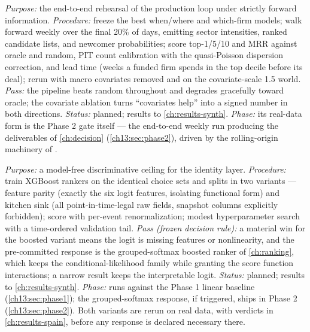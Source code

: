 \begin{protocol}
\label{chcp:prot:e5}
\emph{Purpose:} the end-to-end rehearsal of the production loop under strictly forward information.
\emph{Procedure:} freeze the best when/where and which-firm models; walk forward weekly over the final 20\% of
days, emitting sector intensities, ranked candidate lists, and newcomer probabilities; score top-1/5/10 and
MRR against oracle and random, PIT count calibration with the quasi-Poisson dispersion correction, and lead
time (weeks a funded firm spends in the top decile before its deal); rerun with macro covariates removed and
on the covariate-scale 1.5 world. \emph{Pass:} the pipeline beats random throughout and degrades gracefully
toward oracle; the covariate ablation turns ``covariates help'' into a signed number in both directions.
\emph{Status:} planned; results to \cref{ch:results-synth}. \emph{Phase:} its real-data form is the Phase 2
gate itself --- the end-to-end weekly run producing the deliverables of \cref{ch:decision}
(\cref{ch13:sec:phase2}), driven by the rolling-origin machinery of .
\end{protocol}

\begin{protocol}
\label{chcp:prot:b1}
\emph{Purpose:} a model-free discriminative ceiling for the identity layer. \emph{Procedure:} train XGBoost
rankers \citep{chenguestrin2016} on the identical choice sets and splits in two variants --- feature parity
(exactly the six logit features, isolating functional form) and kitchen sink (all point-in-time-legal raw
fields, snapshot columns explicitly forbidden); score with per-event renormalization; modest hyperparameter
search with a time-ordered validation tail. \emph{Pass (frozen decision rule):} a material win for the boosted
variant means the logit is missing features or nonlinearity, and the pre-committed response is the
grouped-softmax boosted ranker of \cref{ch:ranking}, which keeps the conditional-likelihood family while
granting the score function interactions; a narrow result keeps the interpretable logit. \emph{Status:}
planned; results to \cref{ch:results-synth}. \emph{Phase:} runs against the Phase 1 linear baseline
(\cref{ch13:sec:phase1}); the grouped-softmax response, if triggered, ships in Phase 2
(\cref{ch13:sec:phase2}). Both variants are rerun on real data, with verdicts in \cref{ch:results-spain},
before any response is declared necessary there.
\end{protocol}

